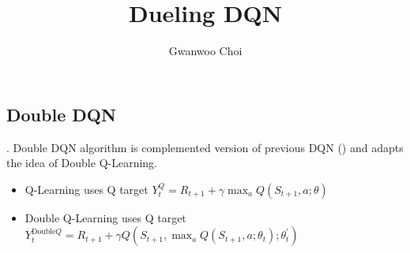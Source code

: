 \documentclass[8pt]{beamer}
\title{Dueling DQN}
\author{Gwanwoo Choi}
\begin{document}
\begin{frame}
    \titlepage
\end{frame}


\subsection{Double DQN}

\begin{frame}{.}
    Double DQN algorithm is complemented version of previous DQN (\cite{mnih2015human}) and adapts the idea of Double Q-Learning.

    \begin{itemize}
        \item Q-Learning uses Q target $Y^{Q}_t = R_{t+1} + \gamma \max_{a} Q(S_{t+1},a ;\theta)$
        \item Double Q-Learning uses Q target $Y^{\text{Double}Q}_t = R_{t+1} + \gamma Q(S_{t+1}, \max_{a} Q(S_{t+1}, a; \theta_t); \theta_t^\prime)$
    \end{itemize}
\end{frame}
\end{document}
